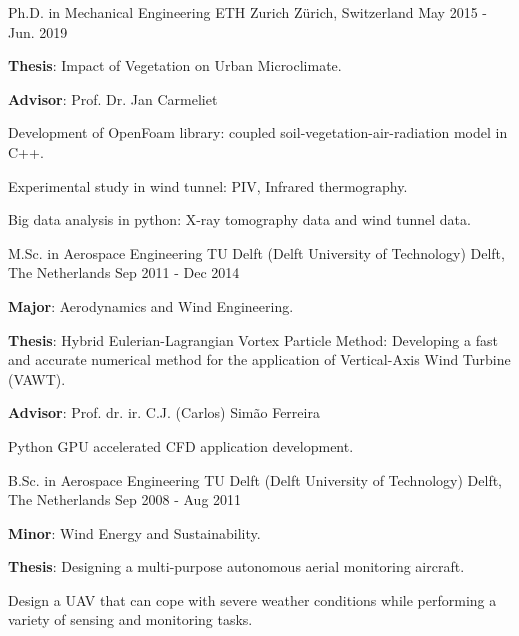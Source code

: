 \documentclass[11pt, a4paper]{preamble/awesome-cv-novo}
\begin{document}
\begin{cventries}

  \cventry
    {Ph.D. in Mechanical Engineering} %
    {ETH Zurich} %
    {Z\"urich, Switzerland} %
    {May 2015 - Jun. 2019} %
    {
      \begin{cvitems} %
        \item {\textbf{Thesis}: Impact of Vegetation on Urban Microclimate.}
        \item {\textbf{Advisor}: Prof. Dr. Jan Carmeliet}
        \item {Development of OpenFoam library: coupled soil-vegetation-air-radiation model in C++.}
        \item {Experimental study in wind tunnel: PIV, Infrared thermography.}
        \item {Big data analysis in python: X-ray tomography data and wind tunnel data.}
      \end{cvitems}
    }

  \cventry
    {M.Sc. in Aerospace Engineering}
    {TU Delft (Delft University of Technology)}
    {Delft, The Netherlands}
    {Sep 2011 - Dec 2014}
    {
      \begin{cvitems}
        \item {\textbf{Major}: Aerodynamics and Wind Engineering.}
        \item {\textbf{Thesis}: Hybrid Eulerian-Lagrangian Vortex Particle Method: Developing a fast and accurate numerical method for the application of Vertical-Axis Wind Turbine (VAWT).}
        \item {\textbf{Advisor}: Prof. dr. ir. C.J. (Carlos) Simão Ferreira}
        \item {Python GPU accelerated CFD application development.}
      \end{cvitems}
    }

  \cventry
    {B.Sc. in Aerospace Engineering}
    {TU Delft (Delft University of Technology)}
    {Delft, The Netherlands}
    {Sep 2008 - Aug 2011}
    {
      \begin{cvitems}
        \item {\textbf{Minor}: Wind Energy and Sustainability.}
        \item {\textbf{Thesis}: Designing a multi-purpose autonomous aerial monitoring aircraft.}
        \item {Design a UAV that can cope with severe weather conditions while performing a variety of sensing and monitoring tasks.}
      \end{cvitems}
    }

\end{cventries}
\end{document}
